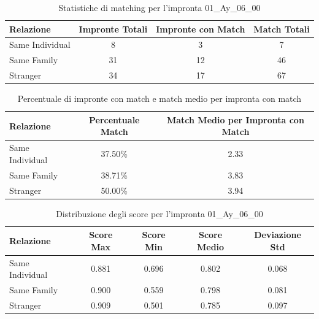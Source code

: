 \begin{table}[htbp]
\centering
\caption{Statistiche di matching per l'impronta 01\_Ay\_06\_00}
\label{tab:results_01_Ay_06_00}
\begin{tabular}{|l|c|c|c|}
\hline
\textbf{Relazione} & \textbf{Impronte Totali} & \textbf{Impronte con Match} & \textbf{Match Totali} \\
\hline
Same Individual & 8 & 3 & 7 \\
\hline
Same Family & 31 & 12 & 46 \\
\hline
Stranger & 34 & 17 & 67 \\
\hline
\end{tabular}
\end{table}


\begin{table}[htbp]
\centering
\caption{Percentuale di impronte con match e match medio per impronta con match}
\label{tab:match_percentage_01_Ay_06_00}
\begin{tabular}{|l|c|c|}
\hline
\textbf{Relazione} & \textbf{Percentuale Match} & \textbf{Match Medio per Impronta con Match} \\
\hline
Same Individual & 37.50\% & 2.33 \\
\hline
Same Family & 38.71\% & 3.83 \\
\hline
Stranger & 50.00\% & 3.94 \\
\hline
\end{tabular}
\end{table}


\begin{table}[htbp]
\centering
\caption{Distribuzione degli score per l'impronta 01\_Ay\_06\_00}
\label{tab:scores_01_Ay_06_00}
\begin{tabular}{|l|c|c|c|c|}
\hline
\textbf{Relazione} & \textbf{Score Max} & \textbf{Score Min} & \textbf{Score Medio} & \textbf{Deviazione Std} \\
\hline
Same Individual & 0.881 & 0.696 & 0.802 & 0.068 \\
\hline
Same Family & 0.900 & 0.559 & 0.798 & 0.081 \\
\hline
Stranger & 0.909 & 0.501 & 0.785 & 0.097 \\
\hline
\end{tabular}
\end{table}

